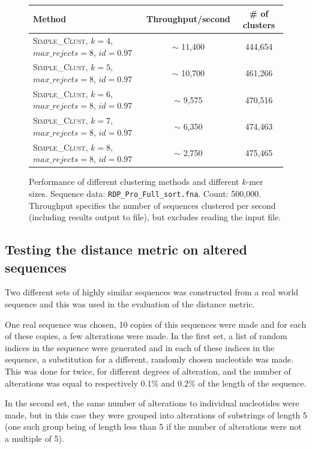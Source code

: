 \begin{figure}[H]
  \centering
  \begin{tabular}{ p{12em} | c | c }
    Method  & Throughput/second   & \# of clusters \\
    \hline \hline
    \textsc{Simple\_Clust}, $k=4$,
    $max\_rejects=8$, $id=0.97$     & $\sim$ 11,400  & 444,654  \\
    \hline
    \textsc{Simple\_Clust}, $k=5$,
    $max\_rejects=8$, $id=0.97$     & $\sim$ 10,700  & 461,266  \\
    \hline
    \textsc{Simple\_Clust}, $k=6$,
    $max\_rejects=8$, $id=0.97$     & $\sim$ 9,575   & 470,516  \\
    \hline
    \textsc{Simple\_Clust}, $k=7$,
    $max\_rejects=8$, $id=0.97$     & $\sim$ 6,350   & 474,463  \\
    \hline
    \textsc{Simple\_Clust}, $k=8$,
    $max\_rejects=8$, $id=0.97$     & $\sim$ 2,750   & 475,465  \\
  \end{tabular}
  \caption{Performance of different clustering methods and different $k$-mer
  sizes. Sequence data:
           \texttt{RDP\_Pro\_Full\_sort.fna}. Count: 500,000. Throughput
           specifies the number of sequences clustered per second (including
           results output to file), but excludes reading the input file.}
\end{figure}


\subsection{Testing the distance metric on altered sequences}

Two different sets of highly similar sequences was constructed from a real
world sequence and this was used in the evaluation of the distance metric.

One real sequence was chosen, 10 copies of this sequences were made and for
each of these copies, a few alterations were made. In the first set, a list of
random indices in the sequence were generated and in each of these indices in
the sequence, a substitution for a different, randomly chosen nucleotide was
made. This was done for twice, for different degrees of alteration, and the
number of alterations was equal to respectively 0.1\% and 0.2\% of the length
of the sequence.

In the second set, the same number of alterations to individual nucleotides
were made, but in this case they were grouped into alterations of substrings of
length 5 (one such group being of length less than 5 if the number of
alterations were not a multiple of 5).

